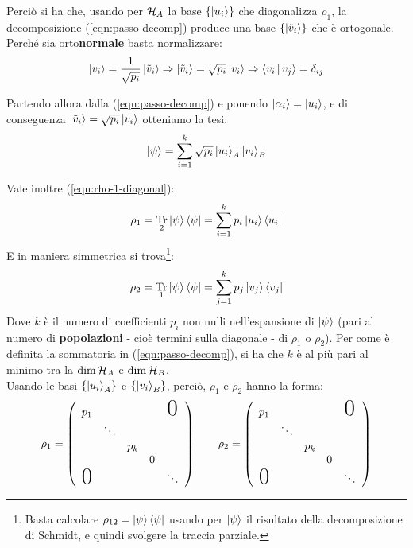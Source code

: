 \documentclass[../../InformazioneQuantistica.tex]{subfiles}
\begin{document}
Perciò si ha che, usando per $\mathcal{H}_A$ la base $\{\Ket{u_i}\}$ che diagonalizza $\rho_1$, la decomposizione (\ref{eqn:passo-decomp}) produce una base $\{\Ket{\tilde{v}_i}\}$ che è ortogonale. Perché sia orto\textbf{normale} basta normalizzare:
\begin{align*}
    \Ket{v_i} = \frac{1}{\sqrt{p_i}} \Ket{\tilde{v}_i} \Rightarrow \Ket{\tilde{v}_i} = \sqrt{p_i}\Ket{v_i} \Rightarrow \Braket{v_i|v_j} = \delta_{ij}
\end{align*}

Partendo allora dalla (\ref{eqn:passo-decomp}) e ponendo $\Ket{\alpha_i} = \Ket{u_i}$, e di conseguenza $\Ket{\tilde{v}_i} = \sqrt{p_i}\Ket{v_i}$ otteniamo la tesi:
\begin{align*}
\Ket{\psi} = \sum_{i=1}^k \sqrt{p_i} \Ket{u_i}_A\Ket{v_i}_B
\end{align*}

Vale inoltre (\ref{eqn:rho-1-diagonal}):
\begin{align*}
\rho_1 = \underset{2}{\operatorname{Tr}}\Ket{\psi}\Bra{\psi} = \sum_{i=1}^k
p_i \Ket{u_i}\Bra{u_i}
\end{align*}
E in maniera simmetrica si trova\footnote{Basta calcolare $\rho_{12} = \Ket{\psi}\Bra{\psi}$ usando per $\Ket{\psi}$ il risultato della decomposizione di Schmidt, e quindi svolgere la traccia parziale.}:
\begin{align*}
\rho_2 = \underset{1}{\operatorname{Tr}} \Ket{\psi}\Bra{\psi} = \sum_{j=1}^k p_{j} \Ket{v_j}\Bra{v_j}
\end{align*}
Dove $k$ è il numero di coefficienti $p_i$ non nulli nell'espansione di $\Ket{\psi}$ (pari al numero di \textbf{popolazioni} - cioè termini sulla diagonale - di $\rho_1$ o $\rho_2$). Per come è definita la sommatoria in (\ref{eqn:passo-decomp}), si ha che $k$ è al più pari al minimo tra la $\operatorname{dim}\mathcal{H}_A$ e $\operatorname{dim}\mathcal{H}_B$.\\
Usando le basi $\{\Ket{u_i}_A\}$ e $\{\Ket{v_i}_B\}$, perciò, $\rho_1$ e $\rho_2$ hanno la forma:
\begin{align*}
\rho_1 = \left(\begin{array}{ccccc}
p_1 & & & & \text{\huge0}  \\
 & \ddots &  & \text{\huge}&  \\
 & & p_k & & \\
 &\text{\huge} & & 0 &  \\
\text{\huge0} & \text{\huge} & & & \ddots
\end{array}
    \right)
    \qquad
\rho_2 = \left(\begin{array}{ccccc}
p_1 & & & & \text{\huge0}  \\
 & \ddots &  & \text{\huge}&  \\
 & & p_k & & \\
 &\text{\huge} & & 0 &  \\
\text{\huge0} & \text{\huge} & & & \ddots
\end{array}
    \right)
\end{align*}
\end{document}
